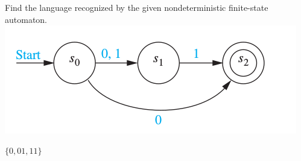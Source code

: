 \documentclass[../main.tex]{subfiles}
\begin{document}
Find the language recognized by the given nondeterministic finite-state automaton. \\
\includegraphics[width=\textwidth]{img/Q13_3_43}

\solution
$\{0, 01, 11\}$
\end{document}
